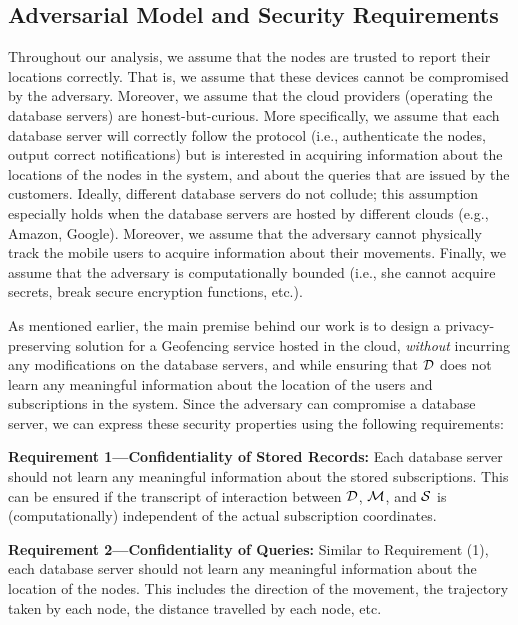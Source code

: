 \documentclass{llncs}
\begin{document}
\subsection{Adversarial Model and Security Requirements}\label{subsec:attack}

Throughout our analysis, we assume that the nodes are trusted to report their locations correctly. That is, we assume that these devices cannot be compromised by the adversary.
Moreover, we assume that the cloud providers (operating the database servers) are honest-but-curious. More specifically, we assume that each database server will correctly follow the protocol (i.e., authenticate the nodes, output correct notifications) but is
interested in acquiring information about the locations of the nodes in the system, and about the queries that are issued by the customers. Ideally, different database servers do not collude; this assumption especially holds when the database servers
are hosted by different clouds (e.g., Amazon, Google). Moreover, we assume that the adversary cannot physically track the
mobile users to acquire information about their movements.
Finally, we assume that the adversary is computationally bounded (i.e., she cannot acquire secrets, break secure encryption functions, etc.).

As mentioned earlier, the main premise behind our work is to design a privacy-preserving solution for a Geofencing service hosted in the cloud, \emph{without} incurring any modifications on the database servers, and while
ensuring that $\cal D$ does not learn any meaningful information about the location of the users and subscriptions in the system. Since the adversary can compromise a database server, we can express
these security properties using the following requirements:

\vspace{1 em} \noindent \textbf{Requirement 1---Confidentiality of Stored Records:} Each database server should not learn any meaningful information about the stored subscriptions.
This can be ensured if the transcript of interaction between $\cal D$, $\cal M$, and $\cal S$ is (computationally) independent of the actual subscription coordinates.

\vspace{1 em} \noindent \textbf{Requirement 2---Confidentiality of Queries:} Similar to Requirement (1), each data\-base server should not learn any meaningful information about the location of the nodes.
This includes the direction of the movement, the trajectory taken by each node, the distance travelled by each node, etc.
\end{document}
